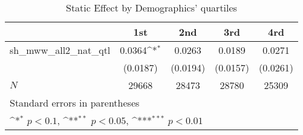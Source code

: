 \begin{table}[htbp]\centering
\def\sym#1{\ifmmode^{#1}\else\(^{#1}\)\fi}
\caption{Static Effect by Demographics' quartiles}
\begin{tabular}{l*{4}{c}}
\hline\hline
            &\multicolumn{1}{c}{1st}&\multicolumn{1}{c}{2nd}&\multicolumn{1}{c}{3rd}&\multicolumn{1}{c}{4rd}\\
\hline
sh\_mww\_all2\_nat\_qtl&      0.0364\sym{*}  &      0.0263         &      0.0189         &      0.0271         \\
            &    (0.0187)         &    (0.0194)         &    (0.0157)         &    (0.0261)         \\
\hline
\(N\)       &       29668         &       28473         &       28780         &       25309         \\
\hline\hline
\multicolumn{5}{l}{\footnotesize Standard errors in parentheses}\\
\multicolumn{5}{l}{\footnotesize \sym{*} \(p<0.1\), \sym{**} \(p<0.05\), \sym{***} \(p<0.01\)}\\
\end{tabular}
\end{table}
